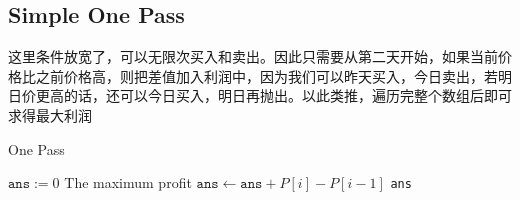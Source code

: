 \subsection{Simple One Pass}
这里条件放宽了，可以无限次买入和卖出。因此只需要从第二天开始，如果当前价格比之前价格高，则把差值加入利润中，因为我们可以昨天买入，今日卖出，若明日价更高的话，还可以今日买入，明日再抛出。以此类推，遍历完整个数组后即可求得最大利润
\setcounter{algorithm}{0}
\begin{algorithm}[H]
\caption{One Pass}
\begin{algorithmic}[1]
\State $\texttt{ans}:=0$ \Comment The maximum profit
\State $\texttt{ans}\gets \texttt{ans} + P[i]-P[i-1]$
\EndIf
\EndFor
\State \Return \texttt{ans}
\EndProcedure
\end{algorithmic}
\end{algorithm}